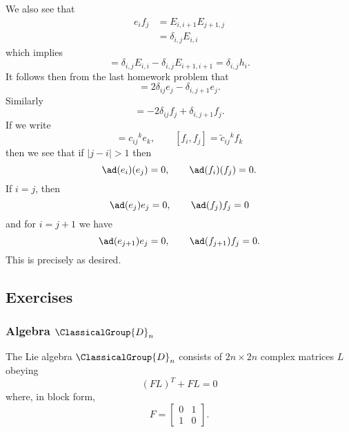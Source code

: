 We also see that
\begin{subequations}
\begin{align}
e_{i}f_{j} &= E_{i,i+1}E_{j+1,j}\\
&= \delta_{i,j}E_{i,i}
\end{align}
\end{subequations}
which implies
\begin{equation}
[e_{i},f_{j}]=\delta_{i,j}E_{i,i}-\delta_{i,j}E_{i+1,i+1}=\delta_{i,j}h_{i}.
\end{equation}
It follows then from the last homework problem that
\begin{equation}
[h_{i},e_{j}] = 2\delta_{ij}e_{j}-\delta_{i,j+1}e_{j}.
\end{equation}
Similarly
\begin{equation}
[h_{i},f_{j}] = -2\delta_{ij}f_{j}+\delta_{i,j+1}f_{j}.
\end{equation}
If we write
\begin{equation}
[e_{i},e_{j}]={c_{ij}}^{k}e_{k},\qquad[f_{i},f_{j}]={{\widetilde{c}}_{ij}}{}^{k}f_{k}
\end{equation}
then we see that if $|j-i|>1$ then
\begin{equation}
\ad(e_{i})(e_{j})=0,\qquad \ad(f_{i})(f_{j})=0.
\end{equation}
If $i=j$, then
\begin{equation}
\ad(e_{j})e_{j}=0,\qquad \ad(f_{j})f_{j}=0
\end{equation}
and for $i=j+1$ we have
\begin{equation}
\ad(e_{j+1})e_{j}=0,\qquad \ad(f_{j+1})f_{j}=0.
\end{equation}
This is precisely as desired.

\subsection{Exercises}
\subsubsection{Algebra \texorpdfstring{$\ClassicalGroup{D}_{n}$}{Dn}}

The Lie algebra $\ClassicalGroup{D}_{n}$ consists of $2n\times2n$ complex matrices
$L$ obeying
\begin{equation}
(FL)^{T}+FL=0
\end{equation}
where, in block form,
\begin{equation}
F=\begin{bmatrix}
0&1\\
1&0
\end{bmatrix}.
\end{equation}


